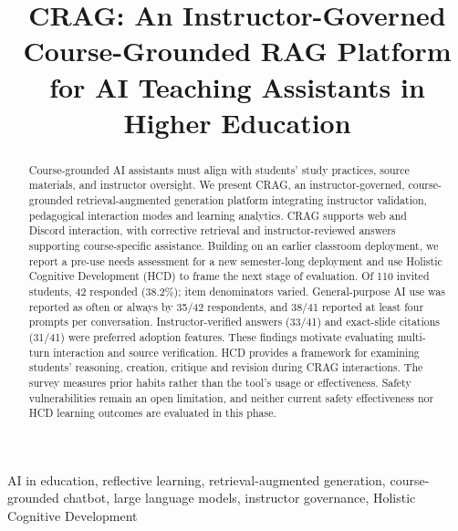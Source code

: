 \documentclass[conference]{IEEEtran}
\begin{document}
\title{CRAG: An Instructor-Governed Course-Grounded RAG Platform for AI Teaching Assistants in Higher Education}

\author{
}

\maketitle

\begin{abstract}
Course-grounded AI assistants must align with students' study practices, source materials, and instructor oversight. We present CRAG, an instructor-governed, course-grounded retrieval-augmented generation platform integrating instructor validation, pedagogical interaction modes and learning analytics.
CRAG supports web and Discord interaction, with corrective retrieval and instructor-reviewed answers supporting course-specific assistance. Building on an earlier classroom deployment, we report a pre-use needs assessment for a new semester-long deployment and use Holistic Cognitive Development (HCD) to frame the next stage of evaluation.
Of 110 invited students, 42 responded (38.2\%); item denominators varied. General-purpose AI use was reported as often or always by 35/42 respondents, and 38/41 reported at least four prompts per conversation. Instructor-verified answers (33/41) and exact-slide citations (31/41) were preferred adoption features. These findings motivate evaluating multi-turn interaction and source verification.
HCD provides a framework for examining students' reasoning, creation, critique and revision during CRAG interactions. The survey measures prior habits rather than the tool's usage or effectiveness. Safety vulnerabilities remain an open limitation, and neither current safety effectiveness nor HCD learning outcomes are evaluated in this phase.
\end{abstract}

\begin{IEEEkeywords}
AI in education, reflective learning, retrieval-augmented generation, course-grounded chatbot, large language models, instructor governance, Holistic Cognitive Development
\end{IEEEkeywords}
\end{document}
